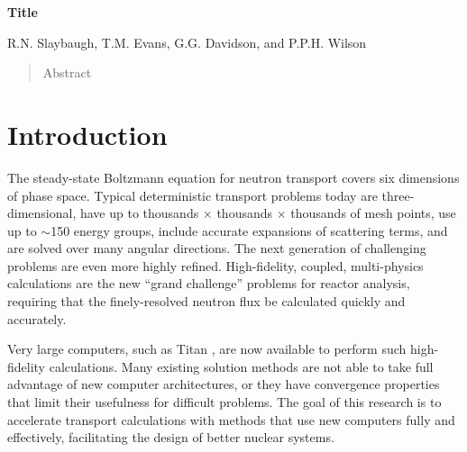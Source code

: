 \documentclass[preprint,12pt]{elsarticle}
\begin{document}
\setcounter{page}{2}
  

\begin{center}

  {\large \bf Title}
  
  \vspace{0.3in}
  
  R.N. Slaybaugh, T.M. Evans, G.G. Davidson, and P.P.H. Wilson
  
\end{center}

\doublespacing

\vspace{0.3in}

\begin{abstract}

  Abstract

\end{abstract}

\newpage


\section{Introduction}
\label{sec:intro}
The steady-state Boltzmann equation for neutron transport covers six dimensions of phase space. Typical deterministic transport problems today are three-dimensional, have up to thousands $\times$ thousands $\times$ thousands of mesh points, use up to $\sim$150 energy groups, include accurate expansions of scattering terms, and are solved over many angular directions. The next generation of challenging problems are even more highly refined. High-fidelity, coupled, multi-physics calculations are the new ``grand challenge'' problems for reactor analysis, requiring that the finely-resolved neutron flux be calculated quickly and accurately.

Very large computers, such as Titan \cite{Titan2013}, are now available to perform such high-fidelity calculations. Many existing solution methods are not able to take full advantage of new computer architectures, or they have convergence properties that limit their usefulness for difficult problems. The goal of this research is to accelerate transport calculations with methods that use new computers fully and effectively, facilitating the design of better nuclear systems. 
\end{document}
